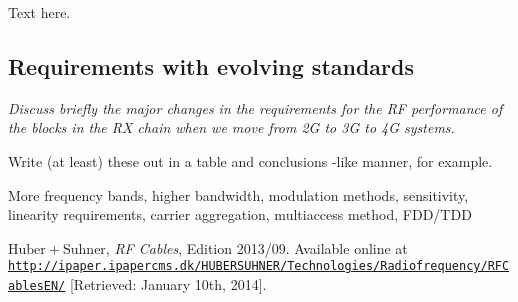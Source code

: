 \documentclass[a4paper, 12pt]{article}
\newlength{\oneLine}
\newlength{\halfLine}
\begin{document}
\vspace*{\halfLine}
\noindent
Text here.


\subsection{Requirements with evolving standards}

\textit{Discuss briefly the major changes in the requirements for the 
RF performance of the blocks in the RX chain when we move from 2G to 
3G to 4G systems.}

\vspace*{\oneLine}
\noindent
Write (at least) these out in a table and conclusions -like manner, for example.

More frequency bands, higher bandwidth, modulation methods, sensitivity, 
linearity requirements, carrier aggregation, multiaccess method, FDD/TDD


\begin{thebibliography}{9}%

 $\mathrm{Huber}+\mathrm{Suhner}$, 
	\textit{RF Cables}, 
	Edition 2013/09. 
	Available online at \href{http://ipaper.ipapercms.dk/HUBERSUHNER/Technologies/Radiofrequency/RFCablesEN/}
		{\texttt{http://ipaper.\linebreak{}ipapercms.dk/HUBERSUHNER/Technologies/Radiofrequency/RFCablesEN/}}
	[Retrieved: January 10th, 2014].

	

	
	

\end{thebibliography}
\end{document}
